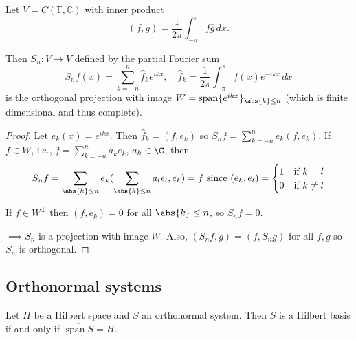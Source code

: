 \documentclass{article}
\DeclareMathOperator{\spn}{span}
\begin{document}
\begin{eg}
    Let $V = C(\mathbb{T}, \mathbb{C})$ with inner product
    \begin{equation*}
        (f, g) = \frac{1}{2\pi} \int_{-\pi}^\pi f \overline{g} \, dx.
    \end{equation*}

    Then $S_n : V \to V$ defined by the partial Fourier sum
    \begin{equation*}
        S_n f(x) = \sum_{k=-n}^n \hat{f}_k e^{ikx}, \quad \hat{f}_k = \frac{1}{2\pi} \int_{-\pi}^\pi f(x) e^{-ikx} \, dx
    \end{equation*}
    is the orthogonal projection with image $W = \spn \{e^{ikx}\}_{\abs{k}\leq n}$ (which is finite dimensional and thus complete).
\end{eg}

\begin{proof}
    Let $e_k(x) = e^{ikx}$. Then $\hat{f}_k = (f, e_k)$ so $S_n f = \sum_{k = -n}^n e_k(f, e_k)$.
    If $f \in W$, i.e., $f = \sum_{k=-n}^n a_k e_k$, $a_k \in \C$, then
    \begin{equation*}
        S_n f = \sum_{\abs{k} \leq n} e_k (\sum_{\abs{k}\leq n} a_l e_l, e_k) = f \text{ since } (e_k, e_l) =
        \begin{cases}
            1 & \text{if } k = l \\
            0 & \text{if } k \neq l
        \end{cases}
    \end{equation*}

    If $f \in W^\perp$ then $(f, e_k) = 0$ for all $\abs{k} \leq n$, so $S_n f= 0$.

    $\implies S_n$ is a projection with image $W$. Also, $(S_n f, g) = (f, S_n g)$ for all $f,g$ so $S_n$ is orthogonal.
\end{proof}


\subsection{Orthonormal systems}
\begin{fact}
    Let $H$ be a Hilbert space and $S$ an orthonormal system. Then $S$ is a Hilbert basis if and only if $\overline{\spn S} = H$.
\end{fact}
\end{document}
